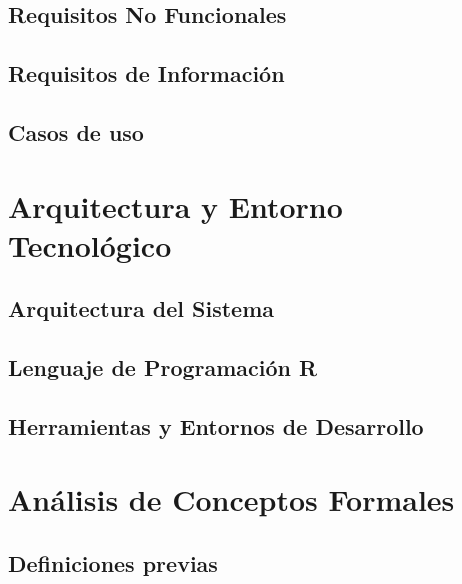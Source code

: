 \documentclass[12pt, a4paper, twoside]{article}
\begin{document}
\subsection{Requisitos No Funcionales}


\subsection{Requisitos de Información}


\subsection{Casos de uso}

\newpage\cleardoublepage


\section{Arquitectura y Entorno Tecnológico}

\subsection{Arquitectura del Sistema}


\subsection{Lenguaje de Programación R}


\subsection{Herramientas y Entornos de Desarrollo}

\newpage\cleardoublepage

\section{Análisis de Conceptos Formales}



\subsection{Definiciones previas}

\end{document}
